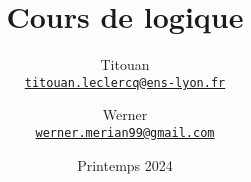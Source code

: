 \title{Cours de logique}
\author{%
	Titouan \\%
	\href{mailto:titouan.leclercq@ens-lyon.fr}{\texttt{titouan.leclercq@ens-lyon.fr}}%
	\and%
	Werner \\%
	\href{mailto:werner.merian99@gmail.com}{\texttt{werner.merian99@gmail.com}}%
}
\date{Printemps 2024}